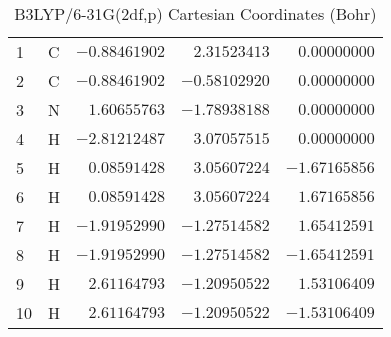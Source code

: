 \documentclass[10pt,oneside]{article}
\begin{document}
\begin{table}[h]
\centering
\caption{B3LYP/6-31G(2df,p) Cartesian Coordinates (Bohr)}
\begin{tabular}{llrrr}
\toprule
1  & C  & $-0.88461902$ & $ 2.31523413$ & $ 0.00000000$ \\
2  & C  & $-0.88461902$ & $-0.58102920$ & $ 0.00000000$ \\
3  & N  & $ 1.60655763$ & $-1.78938188$ & $ 0.00000000$ \\
4  & H  & $-2.81212487$ & $ 3.07057515$ & $ 0.00000000$ \\
5  & H  & $ 0.08591428$ & $ 3.05607224$ & $-1.67165856$ \\
6  & H  & $ 0.08591428$ & $ 3.05607224$ & $ 1.67165856$ \\
7  & H  & $-1.91952990$ & $-1.27514582$ & $ 1.65412591$ \\
8  & H  & $-1.91952990$ & $-1.27514582$ & $-1.65412591$ \\
9  & H  & $ 2.61164793$ & $-1.20950522$ & $ 1.53106409$ \\
10 & H  & $ 2.61164793$ & $-1.20950522$ & $-1.53106409$ \\
\bottomrule
\end{tabular}
\end{table}
\end{document}
